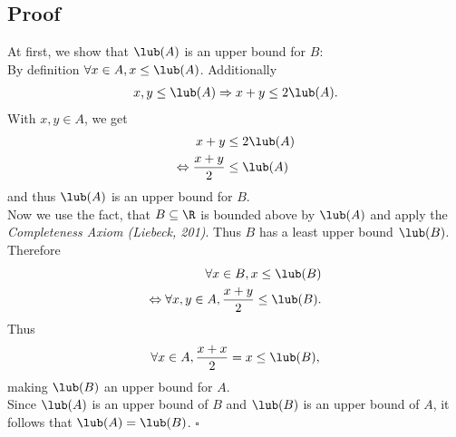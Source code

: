 \documentclass{article}
\begin{document}
\subsection*{Proof}
At first, we show that $\lub(A)$ is an upper bound for $B$:\\
By definition $\forall x \in A, x \leq \lub(A)$. Additionally
\begin{align*}
  x,y\leq \lub(A) \Rightarrow x + y \leq 2\lub(A).
\end{align*}
With $x,y\in A$, we get
\begin{align*}
  x+y                          & \leq 2\lub(A) \\
  \Leftrightarrow\frac{x+y}{2} & \leq \lub(A)
\end{align*}
and thus $\lub(A)$ is an upper bound for $B$.\\
Now we use the fact, that $B\subseteq \R$ is bounded above by $\lub(A)$ and apply the \emph{Completeness Axiom (Liebeck, 201)}. Thus $B$ has a least upper bound $\lub(B)$. Therefore
\begin{align*}
  \forall x \in B, x \leq \lub(B) \\
  \Leftrightarrow \forall x, y \in A, \frac{x+y}{2}\leq \lub(B).
\end{align*}
Thus
\begin{align*}
  \forall x \in A, \frac{x+x}{2}=x \leq \lub(B),
\end{align*}
making $\lub(B)$ an upper bound for $A$.\\
Since $\lub(A)$ is an upper bound of $B$ and $\lub(B)$ is an upper bound of $A$, it follows that $\lub(A)=\lub(B)$. $\square$
\end{document}
